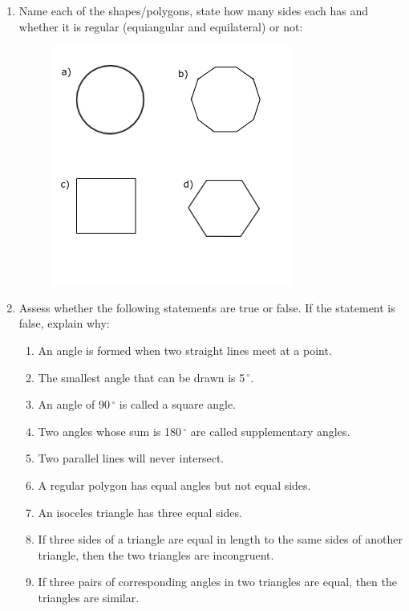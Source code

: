 \begin{enumerate}[noitemsep, label=\textbf{\arabic*}. ]
\begin{figure}[H]
\begin{center}
\vspace{2pt}
\vspace{.1in}
\end{center}
\end{figure}       

\item Name each of the shapes/polygons, state how many sides each has and whether it is regular (equiangular and equilateral) or not:
\setcounter{subfigure}{0}
\begin{figure}[H] %
\begin{center}
\label{m39368*id401233!!!underscore!!!media}\label{m39368*id401233!!!underscore!!!printimage}\includegraphics[width=300px]{col11306.imgs/m39368_MG10C13_068.png} %
\vspace{2pt}
\vspace{.1in}
\end{center}
\end{figure}       
\item Assess whether the following statements are true or false. If the statement is false, explain why:
\begin{enumerate}[noitemsep, label=\textbf{\alph*}. ] 
\item An angle is formed when two straight lines meet at a point.	\item The smallest angle that can be drawn is 5\ensuremath{{\,}^{\circ}}.\item An angle of 90\ensuremath{{\,}^{\circ}} is called a square angle.\item Two angles whose sum is 180\ensuremath{{\,}^{\circ}} are called supplementary angles.\item Two parallel lines will never intersect.\item A regular polygon has equal angles but not equal sides.\item An isoceles triangle has three equal sides.\item If three sides of a triangle are equal in length to the same sides of another triangle, then the two triangles are incongruent.\item If three pairs of corresponding angles in two triangles are equal, then the triangles are similar.\end{enumerate}

\end{enumerate}
